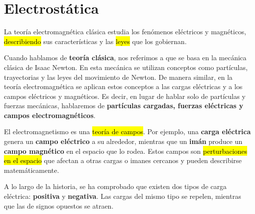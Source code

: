 \section{Electrostática}

La teoría electromagnética clásica estudia los fenómenos eléctricos y magnéticos, \hl{describiendo} sus características y las \hl{leyes} que los gobiernan.  

Cuando hablamos de \textbf{teoría clásica}, nos referimos a que se basa en la mecánica clásica de Isaac Newton. En esta mecánica se utilizan conceptos como partículas, trayectorias y las leyes del movimiento de Newton. De manera similar, en la teoría electromagnética se aplican estos conceptos a las cargas eléctricas y a los campos eléctricos y magnéticos. Es decir, en lugar de hablar solo de partículas y fuerzas mecánicas, hablaremos de \textbf{partículas cargadas, fuerzas eléctricas y campos electromagnéticos}.  

El electromagnetismo es una \hl{teoría de campos}. Por ejemplo, una \textbf{carga eléctrica} genera un \textbf{campo eléctrico} a su alrededor, mientras que un \textbf{imán} produce un \textbf{campo magnético} en el espacio que lo rodea. Estos campos son \hl{perturbaciones en el espacio} que afectan a otras cargas o imanes cercanos y pueden describirse matemáticamente.  

A lo largo de la historia, se ha comprobado que existen dos tipos de carga eléctrica: \textbf{positiva} y \textbf{negativa}. Las cargas del mismo tipo se repelen, mientras que las de signos opuestos se atraen.  










